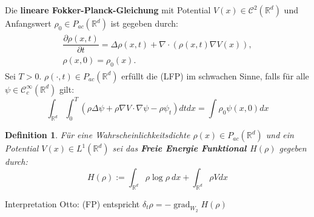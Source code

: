 \documentclass[11pt,a4paper,notitlepage]{scrreprt}
\newcommand{\RR}{\mathbb{R}}
\newcommand{\grad}{\operatorname{grad}}
\newtheorem{defi}{Definition}[section]
\begin{document}
Die \textbf{lineare Fokker-Planck-Gleichung}  mit Potential ${V(x)\in \mathcal{C}^2(\RR^d)}$ und Anfangswert $\rho_0\in P_{ac}(\RR^d)$ ist gegeben durch:
\begin{eqnarray}
\begin{split}
\dfrac{\partial\rho(x,t)}{\partial t}=\Delta\rho(x,t)+\nabla\cdot(\rho(x,t)\nabla V(x)),\\
\rho(x,0)=\rho_0(x).\label{FP}\
\end{split}
\end{eqnarray}
Sei $T>0$. $\rho(\cdot,t)\in P_{ac}(\RR^d)$ erfüllt die (LFP) im schwachen Sinne, falls für alle $\psi\in \mathcal{C}_c^\infty(\RR^d)$ gilt:
\begin{equation*}
\int_{\RR^d} \int_0^T (\rho\Delta\psi+\rho\nabla V\cdot\nabla\psi -\rho\psi_t) dt dx=\int\rho_0\psi(x,0)dx \label{FPweak}
\end{equation*}

\vspace{10pt}

\begin{defi}
Für eine Wahrscheinlichkeitsdichte $\rho(x)\in P_{ac}(\RR^d)$ und ein Potential $V(x)\in L^1(\RR^d)$ sei das \textbf{Freie Energie Funktional $H(\rho)$} gegeben durch:
\begin{equation}
H(\rho):=\int_{\RR^d} \rho\log\rho~ dx + \int_{\RR^d}\rho V dx \label{FEFktn}
\end{equation}
\end{defi}
\vspace{10pt}
Interpretation Otto: (FP) entspricht $\delta_t\rho = -\grad_{W_2} H(\rho)$
\end{document}
